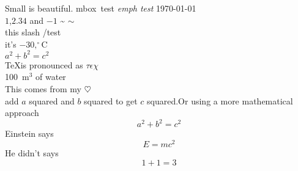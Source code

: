 \documentclass{article}
\begin{document}
Small is beautiful.
\mbox{mbox test}
\emph{emph test}
\today
\\
$1$,$2.34$ and $-1$
\~{}
$\sim$
\\
this slash \slash test
\\
it's $-30,^{\circ}\mathrm{C}$
\\
$a^2+b^2=c^2$
\\
\TeX{}is pronounced as $\tau\epsilon\chi$\\[5pt]
100~m$^{3}$ of water \\[5pt]
This comes from my $\heartsuit$
\\
add $a$ squared and $b$ squared to get $c$ squared.Or using a more mathematical approach
\begin{equation}
  a^2 + b^2 = c^2
\end{equation}
Einstein says
\begin{equation}
  E=mc^2 \label{clever}
\end{equation}
He didn't says
\begin{equation}
  1+1=3 
\end{equation}
\end{document}
